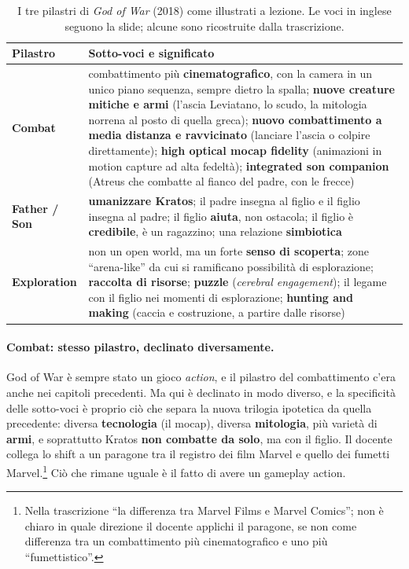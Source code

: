 \begin{table}[htbp]
  \centering
  \caption{I tre pilastri di \emph{God of War} (2018) come illustrati a
  lezione. Le voci in inglese seguono la slide; alcune sono ricostruite
  dalla trascrizione.}
  \label{gd9:tab:gow}
  \small
  \begin{tabular}{@{}p{}p{}@{}}
    \toprule
    \textbf{Pilastro} & \textbf{Sotto-voci e significato} \\
    \midrule
    \textbf{Combat} &
      combattimento più \textbf{cinematografico}, con la camera in un
      unico piano sequenza, sempre dietro la spalla; \textbf{nuove
      creature mitiche e armi} (l'ascia Leviatano, lo scudo, la mitologia
      norrena al posto di quella greca); \textbf{nuovo combattimento a
      media distanza e ravvicinato} (lanciare l'ascia o colpire
      direttamente); \textbf{high optical mocap fidelity} (animazioni in
      motion capture ad alta fedeltà); \textbf{integrated son companion}
      (Atreus che combatte al fianco del padre, con le frecce) \\
    \addlinespace
    \textbf{Father / Son} &
      \textbf{umanizzare Kratos}; il padre insegna al figlio e il figlio
      insegna al padre; il figlio \textbf{aiuta}, non ostacola; il figlio
      è \textbf{credibile}, è un ragazzino; una relazione
      \textbf{simbiotica} \\
    \addlinespace
    \textbf{Exploration} &
      non un open world, ma un forte \textbf{senso di scoperta}; zone
      ``arena-like'' da cui si ramificano possibilità di esplorazione;
      \textbf{raccolta di risorse}; \textbf{puzzle} (\emph{cerebral
      engagement}); il legame con il figlio nei momenti di esplorazione;
      \textbf{hunting and making} (caccia e costruzione, a partire dalle
      risorse) \\
    \bottomrule
  \end{tabular}
\end{table}

\paragraph{Combat: stesso pilastro, declinato diversamente.} God of War è
sempre stato un gioco \emph{action}, e il pilastro del combattimento c'era
anche nei capitoli precedenti. Ma qui è declinato in modo diverso, e la
specificità delle sotto-voci è proprio ciò che separa la nuova trilogia
ipotetica da quella precedente: diversa \textbf{tecnologia} (il mocap),
diversa \textbf{mitologia}, più varietà di \textbf{armi}, e soprattutto Kratos
\textbf{non combatte da solo}, ma con il figlio. Il docente collega lo shift a
un paragone tra il registro dei film Marvel e quello dei fumetti
Marvel.\footnote{Nella trascrizione ``la differenza tra Marvel Films e
Marvel Comics''; non è chiaro in quale direzione il docente applichi il
paragone, se non come differenza tra un combattimento più cinematografico e
uno più ``fumettistico''.} Ciò che rimane uguale è il fatto di avere un
gameplay action.


